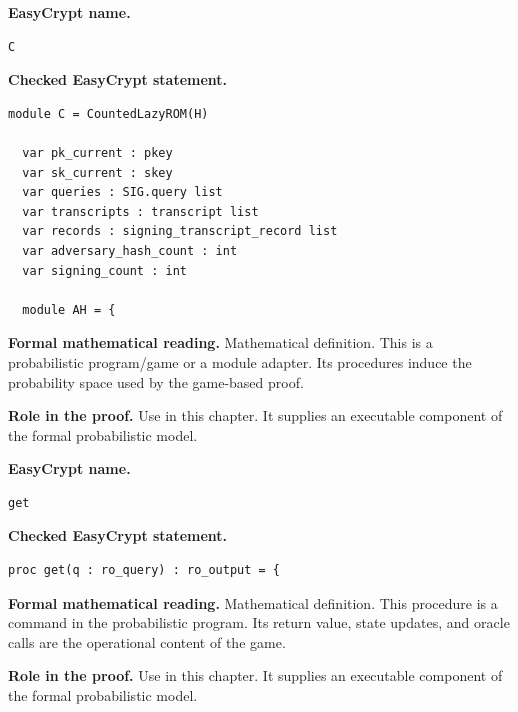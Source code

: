 \begin{formaldefinition}
\noindent\textbf{EasyCrypt name.}
\begin{lstlisting}[language=EasyCrypt,basicstyle=\ttfamily\scriptsize]
C
\end{lstlisting}
\noindent\textbf{Checked EasyCrypt statement.}
\begin{lstlisting}[language=EasyCrypt,basicstyle=\ttfamily\scriptsize]
module C = CountedLazyROM(H)

  var pk_current : pkey
  var sk_current : skey
  var queries : SIG.query list
  var transcripts : transcript list
  var records : signing_transcript_record list
  var adversary_hash_count : int
  var signing_count : int

  module AH = {
\end{lstlisting}
\noindent\textbf{Formal mathematical reading.}
Mathematical definition. This is a probabilistic program/game or a module adapter.  Its procedures induce the probability space used by the game-based proof.

\noindent\textbf{Role in the proof.}
Use in this chapter. It supplies an executable component of the formal probabilistic model.

\end{formaldefinition}

\begin{formaldefinition}
\noindent\textbf{EasyCrypt name.}
\begin{lstlisting}[language=EasyCrypt,basicstyle=\ttfamily\scriptsize]
get
\end{lstlisting}
\noindent\textbf{Checked EasyCrypt statement.}
\begin{lstlisting}[language=EasyCrypt,basicstyle=\ttfamily\scriptsize]
proc get(q : ro_query) : ro_output = {
\end{lstlisting}
\noindent\textbf{Formal mathematical reading.}
Mathematical definition. This procedure is a command in the probabilistic program.  Its return value, state updates, and oracle calls are the operational content of the game.

\noindent\textbf{Role in the proof.}
Use in this chapter. It supplies an executable component of the formal probabilistic model.

\end{formaldefinition}

